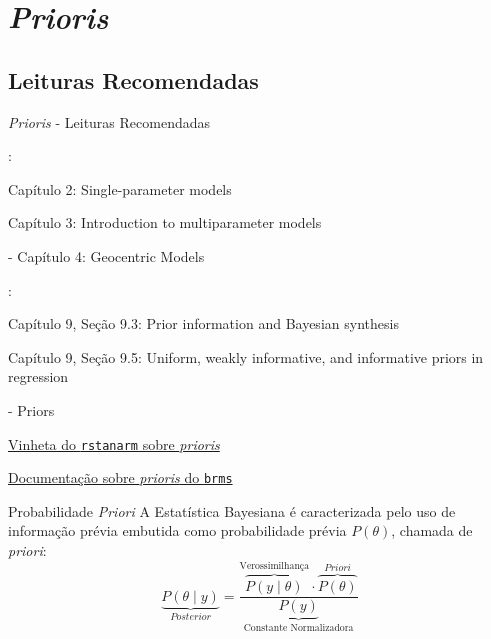 \section{\textit{Prioris}}

\subsection{Leituras Recomendadas}
\begin{frame}{\textit{Prioris} - Leituras Recomendadas}
    \begin{vfilleditems}
        \item \textcite{gelman2013bayesian}:
        \begin{vfilleditems}
            \item Capítulo 2: Single-parameter models
            \item Capítulo 3: Introduction to multiparameter models
        \end{vfilleditems}
        \item \textcite{mcelreath2020statistical} - Capítulo 4: Geocentric Models
        \item \textcite{gelman2020regression}:
        \begin{vfilleditems}
            \item Capítulo 9, Seção 9.3: Prior information and Bayesian synthesis
            \item Capítulo 9, Seção 9.5: Uniform, weakly informative, and informative priors in regression
        \end{vfilleditems}
        \item \textcite{vandeschootBayesianStatisticsModelling2021}
        \item \textcite{storopoli2021estatisticabayesianaR} - Priors
        \item \href{http://mc-stan.org/rstanarm/articles/priors.html}{Vinheta do \texttt{rstanarm} sobre \textit{prioris}}
        \item \href{https://paul-buerkner.github.io/brms/reference/set_prior.html}{Documentação sobre \textit{prioris} do \texttt{brms}}
    \end{vfilleditems}
\end{frame}

\begin{frame}{Probabilidade \textit{Priori}}
    A Estatística Bayesiana é caracterizada pelo uso de informação prévia
    embutida como probabilidade prévia $P(\theta)$, chamada de \textit{priori}:
    $$
    \underbrace{P(\theta \mid y)}_{\textit{Posterior}} = \frac{\overbrace{P(y \mid  \theta)}^{\text{Verossimilhança}} \cdot \overbrace{P(\theta)}^{\textit{Priori}}}{\underbrace{P(y)}_{\text{Constante Normalizadora}}}
    $$
\end{frame}

